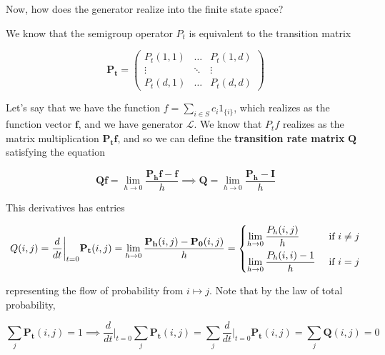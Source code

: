 	Now, how does the generator realize into the finite state space? 

	\begin{example}
		\label{ex:transition-rate-matrix}
		We know that the semigroup operator $P_t$ is equivalent to the transition matrix 

			\begin{equation}
				\mathbf{P_t} = \begin{pmatrix} P_t (1, 1) & \ldots & P_t (1, d) \\ \vdots & \ddots & \vdots \\ P_t (d, 1) & \ldots & P_t (d, d) \end{pmatrix}
			\end{equation}

		Let's say that we have the function $f = \sum_{i \in S} c_i 1_{\{i\}}$, which realizes as the function vector $\mathbf{f}$, and we have generator $\mathscr{L}$. We know that $P_t f$ realizes as the matrix multiplication $\mathbf{P_t} \mathbf{f}$, and so we can define the \textbf{transition rate matrix} $\mathbf{Q}$ satisfying the equation 

			\begin{equation}
				\mathbf{Q} \mathbf{f}= \lim_{h \rightarrow 0} \frac{\mathbf{P_h} \mathbf{f} - \mathbf{f}}{h} \implies \mathbf{Q} = \lim_{h \rightarrow 0} \frac{\mathbf{P_h} - \mathbf{I}}{h}
			\end{equation}

		This derivatives has entries 

			\begin{align}
				Q(i, j) = \frac{d}{dt} \bigg|_{t = 0} \mathbf{P_t} (i, j) = \lim_{h \rightarrow 0} \frac{\mathbf{P_h} (i, j) - \mathbf{P_0} (i, j)}{h} = \begin{dcases} \lim_{h \rightarrow 0} \frac{P_h (i, j)}{h} & \text{ if } i \neq j \\ \lim_{h \rightarrow 0} \frac{P_h (i, i) - 1}{h} & \text{ if } i = j \end{dcases}
			\end{align}

		representing the flow of probability from $i \mapsto j$. Note that by the law of total probability, 

			\begin{equation}
				\sum_j \mathbf{P_t} (i, j) = 1 \implies \frac{d}{dt} \bigg|_{t = 0} \sum_{j} \mathbf{P_t} (i, j) =  \sum_j \frac{d}{dt} \bigg|_{t = 0} \mathbf{P_t} (i, j) = \sum_{j} \mathbf{Q} (i, j) = 0
			\end{equation}


\end{example}
